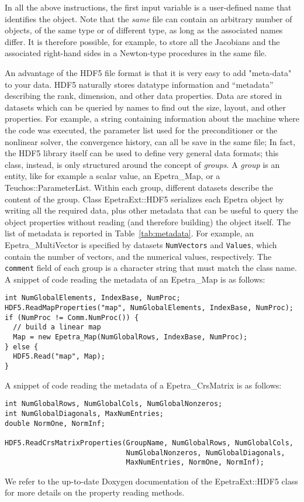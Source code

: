\documentclass[11pt,relax]{SANDreport}
\begin{document}
In all the above instructions, the first input variable is a user-defined name
that identifies the object. Note that the {\sl same} file can contain an
arbitrary number of objects, of the same type or of different type, as long as
the associated names differ. It is therefore possible, for example, to store
all the Jacobians and the associated right-hand sides in a Newton-type
procedures in the same file.

An advantage of the HDF5 file format is that 
it is very easy to add "meta-data" to your data.
HDF5 naturally stores
datatype information and ``metadata'' describing the rank, dimension, and
other data properties. Data are stored in datasets which can be queried by
names to find out the size, layout, and other properties.
For example, a string
containing information about the machine where the code was executed, the
parameter list used for the preconditioner or the nonlinear solver, the
convergence history, can all be save in the same file;
In fact, the HDF5 library itself can be used to define very general data
formats; this class, instead, is only structured around the concept of {\sl
  groups}. 
A {\sl group}
is an entity, like for example a scalar value, an Epetra\_Map, or a
Teuchos::ParameterList. Within each group, different datasets describe the
content of the group. Class EpetraExt::HDF5 serializes each Epetra object by
writing all the required data, plus other metadata that can be useful to query
the object properties without reading (and therefore building) the object
itself. The list of metadata is reported in Table~\ref{tab:metadata}.
For example, an Epetra\_MultiVector is specified by
datasets {\tt NumVectors} and {\tt Values}, which contain the number of vectors, and
the numerical values, respectively. The {\tt comment} field of each group is a
character string that must match the class name. A snippet of code reading the
metadata of an Epetra\_Map is as follows:
\begin{verbatim}
int NumGlobalElements, IndexBase, NumProc;
HDF5.ReadMapProperties("map", NumGlobalElements, IndexBase, NumProc);
if (NumProc != Comm.NumProc()) {
  // build a linear map
  Map = new Epetra_Map(NumGlobalRows, IndexBase, NumProc);
} else {
  HDF5.Read("map", Map);
}
\end{verbatim}

A snippet of code reading the
metadata of a Epetra\_CrsMatrix is as follows:
\begin{verbatim}
int NumGlobalRows, NumGlobalCols, NumGlobalNonzeros;
int NumGlobalDiagonals, MaxNumEntries;
double NormOne, NormInf;

HDF5.ReadCrsMatrixProperties(GroupName, NumGlobalRows, NumGlobalCols,
                             NumGlobalNonzeros, NumGlobalDiagonals, 
                             MaxNumEntries, NormOne, NormInf);
\end{verbatim}
We refer to the up-to-date Doxygen documentation of the EpetraExt::HDF5 class
for more details on the property reading methods.
\end{document}
